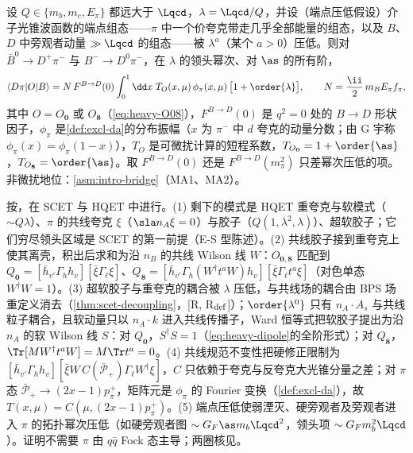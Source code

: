 \begin{theorem}\label{thm:heavy-bdpi}
设 $Q\in\{m_b,m_c,E_\pi\}$ 都远大于 $\Lqcd$，$\lambda=\Lqcd/Q$，并设（端点压低假设）介子光锥波函数的端点组态——$\pi$ 中一个价夸克带走几乎全部能量的组态，以及 $B$、$D$ 中旁观者动量 $\gg\Lqcd$ 的组态——被 $\lambda^{a}$（某个 $a>0$）压低。则对 $\bar B^0\to D^+\pi^-$ 与 $B^-\to D^0\pi^-$，在 $\lambda$ 的领头幂次、对 $\as$ 的所有阶，
\begin{equation}\label{eq:heavy-bdpi}
\langle D\pi|O|B\rangle=N\,F^{B\to D}(0)\int_0^1\dd x\;T_O(x,\mu)\,\phi_\pi(x,\mu)\,\big[1+\order{\lambda}\big],\qquad N=\frac{\ii}{2}\,m_BE_\pi f_\pi ,
\end{equation}
其中 $O=O_{\mathbf 0}$ 或 $O_{\mathbf 8}$（\cref{eq:heavy-O08}），$F^{B\to D}(0)$ 是 $q^2=0$ 处的 $B\to D$ 形状因子，$\phi_\pi$ 是\cref{def:excl-da}的分布振幅（$x$ 为 $\pi^-$ 中 $d$ 夸克的动量分数；由 G 宇称 $\phi_\pi(x)=\phi_\pi(1-x)$），$T_O$ 是可微扰计算的短程系数，$T_{O_{\mathbf 0}}=1+\order{\as}$，$T_{O_{\mathbf 8}}=\order{\as}$。取 $F^{B\to D}(0)$ 还是 $F^{B\to D}(m_\pi^2)$ 只差幂次压低的项。
非微扰地位：\cref{asm:intro-bridge}（MA1、MA2）。
\end{theorem}

\begin{proofsketch}
按\cite{BauerPirjolStewart2001}，在 SCET 与 HQET 中进行。(1) 剩下的模式是 HQET 重夸克与软模式（$\sim Q\lambda$）、$\pi$ 的共线夸克 $\xi$（$\sla n_A\xi=0$）与胶子（$Q(1,\lambda^2,\lambda)$）、超软胶子；它们穷尽领头区域是 SCET 的第一前提（E-S 型陈述）。(2) 共线胶子接到重夸克上使其离壳，积出后求和为沿 $n_B$ 的共线 Wilson 线 $W$：$O_{\mathbf 0,\mathbf 8}$ 匹配到 $Q_{\mathbf 0}=[\bar h_{v'}\Gamma_hh_v][\bar\xi\Gamma_\ell\xi]$、$Q_{\mathbf 8}=[\bar h_{v'}\Gamma_h(W^\dagger t^aW)h_v][\bar\xi\Gamma_\ell t^a\xi]$（对色单态 $W^\dagger W=1$）。(3) 超软胶子与重夸克的耦合被 $\lambda$ 压低，与共线场的耦合由 BPS 场重定义消去（\cref{thm:scet-decoupling}，[R, R$_{\rm def}$]）；$\order{\lambda^0}$ 只有 $n_A\cdot A_s$ 与共线粒子耦合，且软动量只以 $n_A\cdot k$ 进入共线传播子，Ward 恒等式把软胶子提出为沿 $n_A$ 的软 Wilson 线 $S$：对 $Q_{\mathbf 0}$，$S^\dagger S=1$（\cref{eq:heavy-dipole}的全阶形式）；对 $Q_{\mathbf 8}$，$\Tr[MW^\dagger t^aW]=M\Tr t^a=0$\cite[式~(7)]{BauerPirjolStewart2001}。(4) 共线规范不变性把硬修正限制为 $[\bar h_{v'}\Gamma_hh_v][\bar\xi W\,C(\bar{\mathcal P}_+)\Gamma_\ell W^\dagger\xi]$，$C$ 只依赖于夸克与反夸克大光锥分量之差；对 $\pi$ 态 $\bar{\mathcal P}_+\to(2x-1)p_\pi^+$，矩阵元是 $\phi_\pi$ 的 Fourier 变换（\cref{def:excl-da}），故 $T(x,\mu)=C(\mu,(2x-1)p_\pi^+)$。(5) 端点压低使弱湮灭、硬旁观者及旁观者进入 $\pi$ 的拓扑幂次压低（如硬旁观者图 $\sim G_F\as m_b\Lqcd^2$，领头项 $\sim G_Fm_b^2\Lqcd$\cite{BenekeEtAl2000}）。证明不需要 $\pi$ 由 $q\bar q$ Fock 态主导；两圈核见\cite{Huber:2016xod}。
\end{proofsketch}

